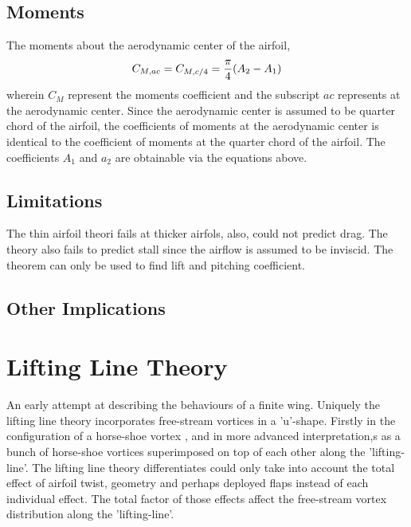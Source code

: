 \documentclass[class=report, 12pt, crop=false]{standalone}
\begin{document}
\begin{center}
\subsection{Moments}
\begin{comment}
\end{comment}
The moments about the aerodynamic center of the airfoil,
$$C_{M,ac} = C_{M,c/4} = \frac{\pi}{4}(A_2 - A_1)$$
wherein $C_M$ represent the moments coefficient and the subscript $ac$ represents at the aerodynamic center. Since the aerodynamic center is assumed to be quarter chord of the airfoil, the coefficients of moments at the aerodynamic center is identical to the coefficient of moments at the quarter chord of the airfoil. The coefficients $A_1$ and $a_2$ are obtainable via the equations above.
\subsection{Limitations}
\begin{comment}
\end{comment}
The thin airfoil theori fails at thicker airfols, also, could not predict drag. The theory also fails to predict stall since the airflow is assumed to be inviscid. The theorem can only be used to find lift and pitching coefficient.
\subsection{Other Implications}
\begin{comment}
\end{comment}
\section{Lifting Line Theory}
\begin{comment}
\end{comment}
An early attempt at describing the behaviours of a finite wing. Uniquely the lifting line theory incorporates free-stream vortices in a 'u'-shape. Firstly in the configuration of a horse-shoe vortex , and in more advanced interpretation,s as a bunch of horse-shoe vortices superimposed on top of each other along the 'lifting-line'. The lifting line theory differentiates could only take into account the total effect of airfoil twist, geometry and perhaps deployed flaps instead of each individual effect. The total factor of those effects affect the free-stream vortex distribution along the 'lifting-line'. 

\end{center}
\end{document}
